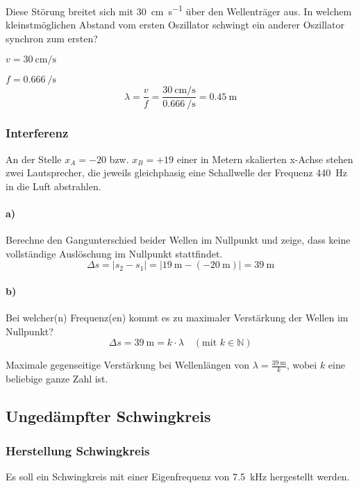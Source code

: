 \documentclass{ajc}
\begin{document}
	Diese Störung breitet sich mit \SI{30}{\cm\per\s} über den Wellenträger aus. In welchem kleinstmöglichen Abstand vom ersten Oszillator schwingt ein anderer Oszillator synchron zum ersten?
	
	$v = \SI{30}{\cm\per\s}$
	
	$f = \SI{0,666}{\per\s}$
	\begin{equation}
		\lambda = \frac{v}{f} = \frac{\SI{30}{\cm\per\s}}{\SI{0,666}{\per\s}} = \SI{0,45}{\m}
	\end{equation}
	
	\subsubsection{Interferenz}
	An der Stelle $x_A = -20$ bzw. $x_B = +19$ einer in Metern skalierten x-Achse stehen zwei Lautsprecher, die jeweils gleichphasig eine Schallwelle der Frequenz \SI{440}{\hertz} in die Luft abstrahlen.
	
	\paragraph{a)} Berechne den Gangunterschied beider Wellen im Nullpunkt und zeige, dass keine vollständige Auslöschung im Nullpunkt stattfindet.
	\begin{equation}
		\Delta s = \left|s_2 - s_1\right| = \left|\SI{19}{\m} - (\SI{-20}{\m})\right| = \SI{39}{\m}
	\end{equation}
	
	\paragraph{b)} Bei welcher(n) Frequenz(en) kommt es zu maximaler Verstärkung der Wellen im Nullpunkt? 
	\begin{equation}
		\Delta s = \SI{39}{\m} = k \cdot \lambda \quad (\text{mit } k \in \mathbb{N})
	\end{equation}
	
	Maximale gegenseitige Verstärkung bei Wellenlängen von $\lambda = \frac{\SI{39}{\m}}{k}$, wobei $k$ eine beliebige ganze Zahl ist.
	
	\newpage
	
	\subsection{Ungedämpfter Schwingkreis}
	
	\subsubsection{Herstellung Schwingkreis}
	Es soll ein Schwingkreis mit einer Eigenfrequenz von \SI{7,5}{\kilo\Hz} hergestellt werden.
	
\end{document}
